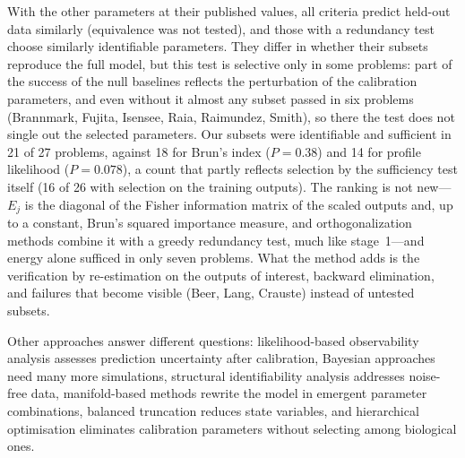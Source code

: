\documentclass[pdflatex,sn-nature]{sn-jnl}
\theoremstyle{plain}
\begin{document}
With the other parameters at their published values, all criteria predict held-out data similarly (equivalence was not tested), and those with a redundancy test choose similarly identifiable parameters. They differ in whether their subsets reproduce the full model, but this test is selective only in some problems: part of the success of the null baselines reflects the perturbation of the calibration parameters, and even without it almost any subset passed in six problems (Brannmark, Fujita, Isensee, Raia, Raimundez, Smith), so there the test does not single out the selected parameters. Our subsets were identifiable and sufficient in 21 of 27 problems, against 18 for Brun's index ($P=0.38$) and 14 for profile likelihood ($P=0.078$), a count that partly reflects selection by the sufficiency test itself (16 of 26 with selection on the training outputs). The ranking is not new---$E_j$ is the diagonal of the Fisher information matrix of the scaled outputs and, up to a constant, Brun's squared importance measure\cite{bib9}, and orthogonalization methods\cite{bib43,bib44,bib45} combine it with a greedy redundancy test, much like stage~1---and energy alone sufficed in only seven problems. What the method adds is the verification by re-estimation on the outputs of interest, backward elimination, and failures that become visible (Beer, Lang, Crauste) instead of untested subsets.

Other approaches answer different questions: likelihood-based observability analysis\cite{bib17} assesses prediction uncertainty after calibration, Bayesian approaches\cite{bib20} need many more simulations, structural identifiability analysis\cite{bib4,bib10,bib29} addresses noise-free data, manifold-based methods\cite{bib36} rewrite the model in emergent parameter combinations, balanced truncation\cite{bib22,bib1} reduces state variables, and hierarchical optimisation\cite{bib39} eliminates calibration parameters without selecting among biological ones.
\end{document}
